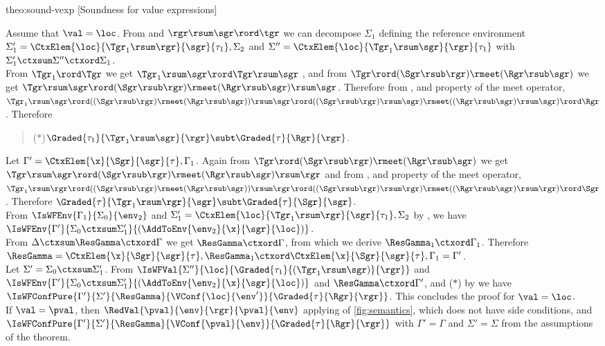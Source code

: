 \begin{proofOf}{theo:sound-vexp} [Soundness for value expressions]
\begin{description}
%
Assume that $\val=\loc$.
From  and $\rgr\rsum\sgr\rord\tgr$ we can decompose $\Sigma_1$ defining the reference
environment
$\Sigma'_1=\CtxElem{\loc}{\Tgr_1\rsum\rgr}{\sgr}{\tau_1},\Sigma_2$ and $\Sigma''=\CtxElem{\loc}{\Tgr_1\rsum\sgr}{\rgr}{\tau_1}$
with $\Sigma'_1\ctxsum\Sigma''\ctxord\Sigma_1$.\\
From  $\Tgr_1\rord\Tgr$ we get $\Tgr_1\rsum\sgr\rord\Tgr\rsum\sgr$ , and from $\Tgr\rord(\Sgr\rsub\rgr)\rmeet(\Rgr\rsub\sgr)$ we get  $\Tgr\rsum\sgr\rord(\Sgr\rsub\rgr)\rmeet(\Rgr\rsub\sgr)\rsum\sgr$.
Therefore  from 
,  and property of
the meet operator, $\Tgr_1\rsum\sgr\rord((\Sgr\rsub\rgr)\rmeet(\Rgr\rsub\sgr))\rsum\sgr\rord((\Sgr\rsub\rgr)\rsum\sgr)\rmeet((\Rgr\rsub\sgr)\rsum\sgr)\rord\Rgr$.
Therefore 
\begin{quote}
($\ast$)\quad $\Graded{{\tau_1}}{\Tgr_1\rsum\sgr}{\rgr}\subt\Graded{\tau}{\Rgr}{\rgr}$.
\end{quote}
Let  $\Gamma'=\CtxElem{\x}{\Sgr}{\sgr}{\tau},\Gamma_1$. Again from  $\Tgr\rord(\Sgr\rsub\rgr)\rmeet(\Rgr\rsub\sgr)$ we get  $\Tgr\rsum\sgr\rord(\Sgr\rsub\rgr)\rmeet(\Rgr\rsub\sgr)\rsum\rgr$ and from 
,  and property of
the meet operator, $\Tgr_1\rsum\rgr\rord((\Sgr\rsub\rgr)\rmeet(\Rgr\rsub\sgr))\rsum\rgr\rord((\Sgr\rsub\rgr)\rsum\rgr)\rmeet((\Rgr\rsub\sgr)\rsum\rgr)\rord\Sgr$. Therefore
 $\Graded{{\tau}}{\Tgr_1\rsum\rgr}{\sgr}\subt\Graded{\tau}{\Sgr}{\sgr}$. \\
From $\IsWFEnv{\Gamma_1}{\Sigma_0}{\env_2}$ and $\Sigma'_1=\CtxElem{\loc}{\Tgr_1\rsum\rgr}{\sgr}{\tau_1},\Sigma_2$  by , we have 
 $\IsWFEnv{\Gamma'}{\Sigma_0\ctxsum\Sigma'_1}{(\AddToEnv{\env_2}{\x}{\sgr}{\loc})}$. \\
From $\Delta\ctxsum\ResGamma\ctxord\Gamma$ we get $\ResGamma\ctxord\Gamma$, from which we derive $\ResGamma_1\ctxord\Gamma_1$.
Therefore $\ResGamma=\CtxElem{\x}{\Sgr}{\sgr}{\tau},\ResGamma_1\ctxord\CtxElem{\x}{\Sgr}{\sgr}{\tau},\Gamma_1=\Gamma'$.\\
  Let $\Sigma'=\Sigma_0\ctxsum\Sigma'_1$. From $\IsWFVal{\Sigma''}{\loc}{\Graded{{\tau_1}}{(\Tgr_1\rsum\sgr)}{\rgr}}$ and 
 $\IsWFEnv{\Gamma'}{\Sigma_0\ctxsum\Sigma'_1}{(\AddToEnv{\env_2}{\x}{\sgr}{\loc})}$ and   $\ResGamma\ctxord\Gamma'$,
 and ($\ast$) by  
   we have $\IsWFConfPure{\Gamma'}{\Sigma'}{\ResGamma}{\VConf{\loc}{\env'}}{\Graded{\tau}{\Rgr}{\rgr}}$.
  This concludes the proof for  $\val=\loc$.\\
  If $\val=\pval$, then $\RedVal{\pval}{\env}{\rgr}{\pval}{\env}$ applying   of \cref{fig:semantics}, which does not have side conditions, and  
  $\IsWFConfPure{\Gamma'}{\Sigma'}{\ResGamma}{\VConf{\pval}{\env}}{\Graded{\tau}{\Rgr}{\rgr}}$ 
  with $\Gamma'=\Gamma$ and $\Sigma'=\Sigma$ from the assumptions of the theorem.


\end{description}
\end{proofOf}

